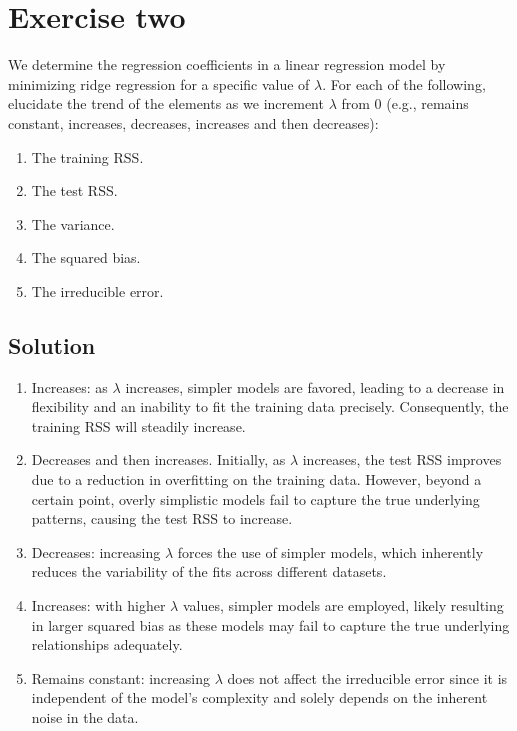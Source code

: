 \section{Exercise two}

We determine the regression coefficients in a linear regression model by minimizing ridge regression for a specific value of $\lambda$. 
For each of the following, elucidate the trend of the elements as we increment $\lambda$ from $0$ (e.g., remains constant, increases, decreases, increases and then decreases):
\begin{enumerate}
    \item The training RSS. 
    \item The test RSS. 
    \item The variance. 
    \item The squared bias. 
    \item The irreducible error. 
\end{enumerate}

\subsection*{Solution}
\begin{enumerate}
    \item Increases: as $\lambda$ increases, simpler models are favored, leading to a decrease in flexibility and an inability to fit the training data precisely. 
        Consequently, the training RSS will steadily increase.
    \item Decreases and then increases. 
        Initially, as $\lambda$ increases, the test RSS improves due to a reduction in overfitting on the training data. 
        However, beyond a certain point, overly simplistic models fail to capture the true underlying patterns, causing the test RSS to increase.
    \item Decreases: increasing $\lambda$ forces the use of simpler models, which inherently reduces the variability of the fits across different datasets.
    \item Increases: with higher $\lambda$ values, simpler models are employed, likely resulting in larger squared bias as these models may fail to capture the true underlying relationships adequately.
    \item Remains constant: increasing $\lambda$ does not affect the irreducible error since it is independent of the model's complexity and solely depends on the inherent noise in the data.
\end{enumerate}